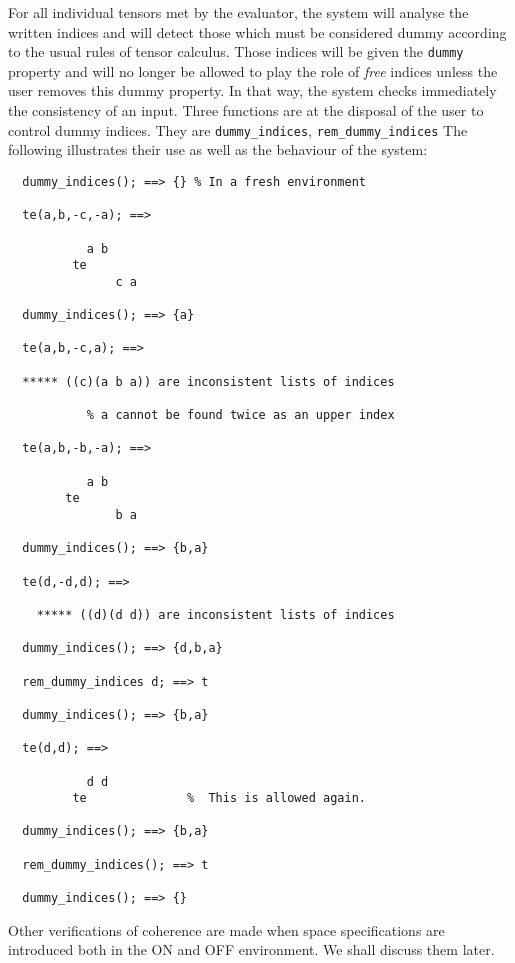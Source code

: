 
\hypertarget{operator:DUMMY_INDICES}{}
\hypertarget{command:REM_DUMMY_INDICES}{}
For all individual tensors met by the evaluator, the system will analyse
the written indices and will detect those which must be considered dummy
according to the usual rules of tensor calculus. Those indices will be given
the \texttt{dummy} property and will no longer be allowed to play the role
of \emph{free} indices unless the user removes this dummy property.
In that way, the system checks immediately the consistency of an input.
Three functions are at the disposal of the user to control dummy indices.
They are \texttt{dummy\_indices},
\texttt{rem\_dummy\_indices}
The following illustrates their use as well as the behaviour of the
system:
\begin{verbatim}
  dummy_indices(); ==> {} % In a fresh environment

  te(a,b,-c,-a); ==>

           a b
         te
               c a

  dummy_indices(); ==> {a}

  te(a,b,-c,a); ==>

  ***** ((c)(a b a)) are inconsistent lists of indices

           % a cannot be found twice as an upper index

  te(a,b,-b,-a); ==>

           a b
        te
               b a

  dummy_indices(); ==> {b,a}

  te(d,-d,d); ==>

    ***** ((d)(d d)) are inconsistent lists of indices

  dummy_indices(); ==> {d,b,a}

  rem_dummy_indices d; ==> t

  dummy_indices(); ==> {b,a}

  te(d,d); ==>

           d d
         te              %  This is allowed again.

  dummy_indices(); ==> {b,a}

  rem_dummy_indices(); ==> t

  dummy_indices(); ==> {}
\end{verbatim}
Other verifications of coherence are made when space specifications
are introduced both in the ON and OFF  environment. We shall
discuss them later.

